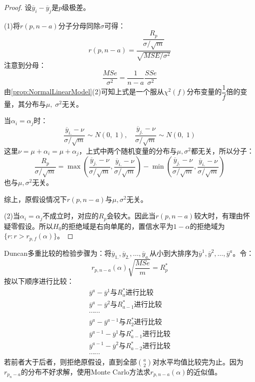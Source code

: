\begin{proof}
	设$\overline{y}_i-\overline{y}_j$是$p$级极差。\par
	(1)将$r(p,n-a)$分子分母同除$\sigma$可得：
	\begin{equation*}
		r(p,n-a)=\frac{\dfrac{R_p}{\sigma/\sqrt{m}}}{\sqrt{MSE/\sigma^2}}
	\end{equation*}
	注意到分母：
	\begin{equation*}
		\frac{MSe}{\sigma^2}=\frac{1}{n-a}\frac{SSe}{\sigma^2}
	\end{equation*}
	由\cref{prop:NormalLinearModel}(2)可知上式是一个服从$\chi^2(f)$分布变量的$\dfrac{1}{f}$倍的变量，其分布与$\mu,\;\sigma^2$无关。\par
	当$\alpha_i=\alpha_j$时：
	\begin{equation*}
		\frac{\overline{y}_{i.}-\nu}{\sigma/\sqrt{m}}\sim N(0,\;1),\quad\frac{\overline{y}_{j.}-\nu}{\sigma/\sqrt{m}}\sim N(0,\;1)
	\end{equation*}
	这里$\nu=\mu+\alpha_i=\mu+\alpha_j$，上式中两个随机变量的分布与$\mu,\sigma^2$都无关，所以分子：
	\begin{equation*}
		\frac{R_p}{\sigma/\sqrt{m}}=\max(\frac{\overline{y}_{j.}-\nu}{\sigma/\sqrt{m}},\frac{\overline{y}_{i.}-\nu}{\sigma/\sqrt{m}})-\min(\frac{\overline{y}_{j.}-\nu}{\sigma/\sqrt{m}},\frac{\overline{y}_{i.}-\nu}{\sigma/\sqrt{m}})
	\end{equation*}
	也与$\mu,\sigma^2$无关。\par
	综上，原假设情况下$r(p,n-a)$与$\mu,\sigma^2$无关。\par
	(2)当$\alpha_i=\alpha_j$不成立时，对应的$R_p$会较大。因此当$r(p,n-a)$较大时，有理由怀疑零假设。所以$H_0$的拒绝域是右向单尾的，置信水平为$1-\alpha$的拒绝域为$\{r:r>r_{p,f}(\alpha)\}$。
\end{proof}
\begin{note}
	Duncan多重比较的检验步骤为：将$\overline{y}_{1.},\overline{y}_{2.},\dots,\overline{y}_{a.}$从小到大排序为$\overline{y}^1,\overline{y}^2,\dots,\overline{y}^a$。令：
	\begin{equation*}
		r_{p,n-a}(\alpha)\sqrt{\frac{MSe}{m}}=R_p^*
	\end{equation*}
	按以下顺序进行比较：
	\begin{gather*}
		\overline{y}^a-\overline{y}^1\text{与$R_a^*$进行比较} \\
		\overline{y}^a-\overline{y}^2\text{与$R_{a-1}^*$进行比较} \\
		\cdots\cdots \\
		\overline{y}^a-\overline{y}^{a-1}\text{与$R_2^*$进行比较} \\
		\overline{y}^{a-1}-\overline{y}^1\text{与$R_{a-1}^*$进行比较} \\
		\overline{y}^{a-1}-\overline{y}^2\text{与$R_{a-2}^*$进行比较} \\
		\cdots\cdots
	\end{gather*}
	若前者大于后者，则拒绝原假设，直到全部$\binom{a}{2}$对水平均值比较完为止。因为$r_{p_n-a}$的分布不好求解，使用Monte Carlo方法求$r_{p,n-a}(\alpha)$的近似值。
\end{note}
